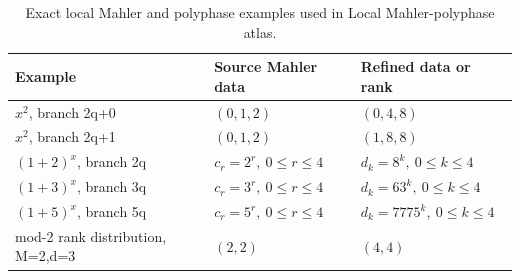 \begin{table}[htbp]
\centering
\caption{Exact local Mahler and polyphase examples used in Local Mahler-polyphase atlas.}
\label{tab:block08-examples}
\small
\begin{tabularx}{\textwidth}{@{}L{0.31\textwidth}L{0.29\textwidth}Y@{}}
\toprule
Example & Source Mahler data & Refined data or rank\\
\midrule
\(x^2\), branch 2q+0 & \( (0, 1, 2) \) & \( (0, 4, 8) \)\\
\(x^2\), branch 2q+1 & \( (0, 1, 2) \) & \( (1, 8, 8) \)\\
\((1+2)^x\), branch 2q & \(c_r=2^r,\ 0\leq r\leq4\) & \(d_k=8^k,\ 0\leq k\leq4\)\\
\((1+3)^x\), branch 3q & \(c_r=3^r,\ 0\leq r\leq4\) & \(d_k=63^k,\ 0\leq k\leq4\)\\
\((1+5)^x\), branch 5q & \(c_r=5^r,\ 0\leq r\leq4\) & \(d_k=7775^k,\ 0\leq k\leq4\)\\
mod-2 rank distribution, M=2,d=3 & \( (2, 2) \) & \( (4, 4) \)\\
\bottomrule
\end{tabularx}
\end{table}
